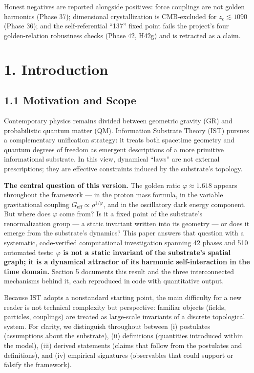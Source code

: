 \documentclass[
  11pt,
]{article}
\begin{document}
Honest negatives are reported alongside positives: force couplings are
not golden harmonics (Phase 37); dimensional crystallization is
CMB-excluded for \(z_c \lesssim 1090\) (Phase 36); and the
self-referential ``137'' fixed point fails the project's four
golden-relation robustness checks (Phase 42, H42g) and is retracted as a
claim.

\section{1. Introduction}\label{introduction}

\subsection{1.1 Motivation and Scope}\label{motivation-and-scope}

Contemporary physics remains divided between geometric gravity (GR) and
probabilistic quantum matter (QM). Information Substrate Theory (IST)
pursues a complementary unification strategy: it treats both spacetime
geometry and quantum degrees of freedom as emergent descriptions of a
more primitive informational substrate. In this view, dynamical ``laws''
are not external prescriptions; they are effective constraints induced
by the substrate's topology.

\textbf{The central question of this version.} The golden ratio
\(\varphi \approx 1.618\) appears throughout the framework --- in the
proton mass formula, in the variable gravitational coupling
\(G_{\text{eff}} \propto \rho^{1/\varphi}\), and in the oscillatory dark
energy component. But where does \(\varphi\) come from? Is it a fixed
point of the substrate's renormalization group --- a static invariant
written into its geometry --- or does it emerge from the substrate's
dynamics? This paper answers that question with a systematic,
code-verified computational investigation spanning 42 phases and 510
automated tests: \textbf{\(\varphi\) is not a static invariant of the
substrate's spatial graph; it is a dynamical attractor of its harmonic
self-interaction in the time domain.} Section 5 documents this result
and the three interconnected mechanisms behind it, each reproduced in
code with quantitative output.

Because IST adopts a nonstandard starting point, the main difficulty for
a new reader is not technical complexity but perspective: familiar
objects (fields, particles, couplings) are treated as large-scale
invariants of a discrete topological system. For clarity, we distinguish
throughout between (i) postulates (assumptions about the substrate),
(ii) definitions (quantities introduced within the model), (iii) derived
statements (claims that follow from the postulates and definitions), and
(iv) empirical signatures (observables that could support or falsify the
framework).
\end{document}
